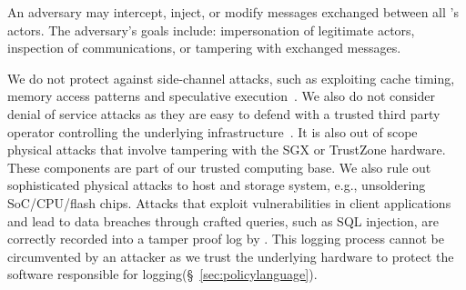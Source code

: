  An adversary may intercept, inject, or modify messages exchanged between all \project{}'s actors. %
The adversary's goals include: impersonation of legitimate actors, inspection of communications, or tampering with exchanged messages.


We do not protect against side-channel attacks, such as exploiting cache timing, memory access patterns and speculative execution~\cite{bulck-security-2018, hahnel-atc-2017, xu-ieeesp-2015}. 
We also do not consider denial of service attacks as they are easy to defend with a trusted third party operator controlling the underlying infrastructure~\cite{baumann2014}.
It is also out of scope physical attacks that involve tampering with the SGX or TrustZone hardware. These components are part of our trusted computing base. We also rule out sophisticated physical attacks to host and storage system, e.g., unsoldering SoC/CPU/flash chips. %
Attacks that exploit vulnerabilities in client applications and lead to data breaches through crafted queries, such as SQL injection, are correctly recorded into a tamper proof log by \project{}. This logging process cannot be circumvented by an attacker as we trust the underlying hardware to protect the software responsible for logging(\S~\ref{sec:policylanguage}).
